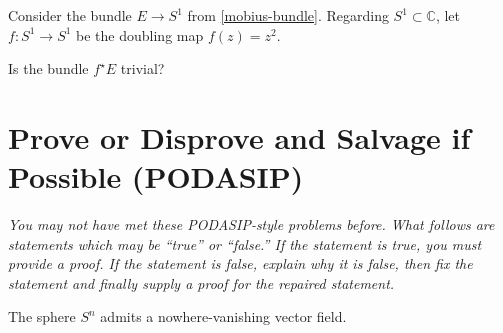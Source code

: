 \documentclass{homework}
\begin{document}
\begin{problem}
  Consider the bundle $E \to S^1$ from \ref{mobius-bundle}.  Regarding
  $S^1 \subset \mathbb{C}$, let $f : S^1 \to S^1$ be the doubling map
  $f(z) = z^2$.

  Is the bundle $f^\star E$ trivial?
\end{problem}

\section{Prove or Disprove and Salvage if Possible (PODASIP)}

\textit{You may not have met these PODASIP-style problems before.
  What follows are statements which may be ``true'' or ``false.''  If
  the statement is true, you must provide a proof.  If the statement
  is false, explain why it is false, then fix the statement and
  finally supply a proof for the repaired statement.}

\begin{problem}
  The sphere $S^n$ admits a nowhere-vanishing vector field.
\end{problem}
\end{document}
